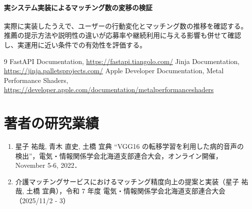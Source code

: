 \documentclass[twocolumn,a4j,dvipdfmx]{jsarticle_customized1}
\begin{document}
\paragraph{実システム実装によるマッチング数の変移の検証}
実際に実装したうえで、ユーザーの行動変化とマッチング数の推移を確認する。推薦の提示方法や説明性の違いが応募率や継続利用に与える影響も併せて確認し、実運用に近い条件での有効性を評価する。

\vspace{-0.8em}
{\scriptsize
\setlength{\itemsep}{0pt}
\setlength{\parsep}{0pt}
\renewcommand{\refname}{\small 参考文献}
\begin{thebibliography}{9}
 FastAPI Documentation, \url{https://fastapi.tiangolo.com/}
 Jinja Documentation, \url{https://jinja.palletsprojects.com/}
 Apple Developer Documentation, Metal Performance Shaders, \url{https://developer.apple.com/documentation/metalperformanceshaders}
\end{thebibliography}
}

\vspace{-0.6em}
\section*{\small 著者の研究業績}
{\scriptsize
\setlength{\itemsep}{0pt}
\setlength{\parsep}{0pt}
\begin{enumerate}
\item 星子 祐哉, 青木 直史, 土橋 宜典 “VGG16 の転移学習を利用した病的音声の検出”，電気・情報関係学会北海道支部連合大会，オンライン開催，November 5-6, 2022．
\item 介護マッチングサービスにおけるマッチング精度向上の提案と実装（星子 祐哉, 土橋 宜典），令和 7 年度 電気・情報関係学会北海道支部連合大会（2025/11/2 - 3）
\end{enumerate}
}
\end{document}
